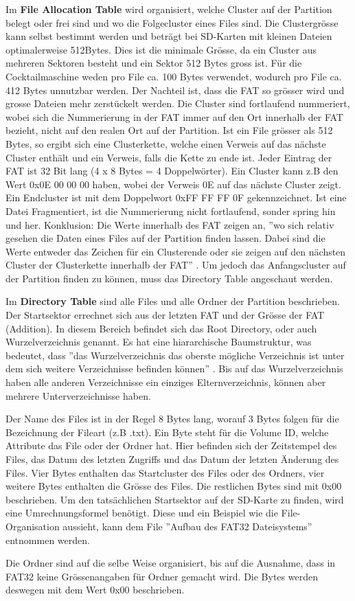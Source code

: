 Im \textbf{File Allocation Table} wird organisiert, welche Cluster auf der Partition belegt oder frei sind und wo die Folgecluster eines Files sind. Die Clustergrösse kann selbst bestimmt werden und beträgt bei SD-Karten mit kleinen Dateien optimalerweise 512Bytes. Dies ist die minimale Grösse, da ein Cluster aus mehreren Sektoren besteht und ein Sektor 512 Bytes gross ist. Für die Cocktailmaschine weden pro File ca. 100 Bytes verwendet, wodurch pro File ca. 412 Bytes unnutzbar werden. Der Nachteil ist, dass die FAT so grösser wird und grosse Dateien mehr zerstückelt werden. Die Cluster sind fortlaufend nummeriert, wobei sich die Nummerierung in der FAT immer auf den Ort innerhalb der FAT bezieht, nicht auf den realen Ort auf der Partition. Ist ein File grösser als 512 Bytes, so ergibt sich eine Clusterkette, welche einen Verweis auf das nächste Cluster enthält und ein Verweis, falls die Kette zu ende ist. Jeder Eintrag der FAT ist 32 Bit lang (4 x 8 Bytes = 4 Doppelwörter). Ein Cluster kann z.B den Wert 0x0E 00 00 00 haben, wobei der Verweis 0E auf das nächste Cluster zeigt. Ein Endcluster ist mit dem Doppelwort 0xFF FF FF 0F gekennzeichnet. Ist eine Datei Fragmentiert, ist die Nummerierung nicht fortlaufend, sonder spring hin und her. Konklusion: Die Werte innerhalb des FAT zeigen an, ''wo sich relativ gesehen die Daten eines Files auf der Partition finden lassen. Dabei sind die Werte entweder das Zeichen für ein Clusterende oder sie zeigen auf den nächsten Cluster der Clusterkette innerhalb der FAT'' \cite{milsch_aufbau_2009}. Um jedoch das Anfangscluster auf der Partition finden zu können, muss das Directory Table angeschaut werden.

\newpage

Im \textbf{Directory Table} sind alle Files und alle Ordner der Partition beschrieben. Der Startsektor errechnet sich aus der letzten FAT und der Grösse der FAT (Addition). In diesem Bereich befindet sich das Root Directory, oder auch Wurzelverzeichnis genannt. Es hat eine hiararchische Baumstruktur, was bedeutet, dass ''das Wurzelverzeichnis das oberste mögliche Verzeichnis ist unter dem sich weitere Verzeichnisse befinden können'' \cite{milsch_aufbau_2009}. Bis auf das Wurzelverzeichnis haben alle anderen Verzeichnisse ein einziges Elternverzeichnis, können aber mehrere Unterverzeichnisse haben. \cite{informatikuni-ulmde_fat32slide_2002}

Der Name des Files ist in der Regel 8 Bytes lang, worauf 3 Bytes folgen für die Bezeichnung der Fileart (z.B .txt). Ein Byte steht für die Volume ID, welche Attribute das File oder der Ordner hat. Hier befinden sich der Zeitstempel des Files, das Datum des letzten Zugriffs und das Datum der letzten Änderung des Files. Vier Bytes enthalten das Startcluster des Files oder des Ordners, vier weitere Bytes enthalten die Grösse des Files. Die restlichen Bytes sind mit 0x00 beschrieben. Um den tatsächlichen Startsektor auf der SD-Karte zu finden, wird eine Umrechnungsformel benötigt. Diese und ein Beispiel wie die File-Organisation aussieht, kann dem File ''Aufbau des FAT32 Dateisystems'' entnommen werden.\cite{milsch_aufbau_2009}


Die Ordner sind auf die selbe Weise organisiert, bis auf die Ausnahme, dass in FAT32 keine Grössenangaben für Ordner gemacht wird. Die Bytes werden deswegen mit dem Wert 0x00 beschrieben.